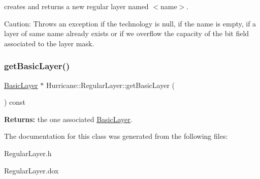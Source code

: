 creates and returns a new regular layer named {\ttfamily $<$name$>$}.

\begin{DoxyParagraph}{Caution\+:}
Throws an exception if the technology is null, if the name is empty, if a layer of same name already exists or if we overflow the capacity of the bit field associated to the layer mask. 
\end{DoxyParagraph}
\mbox{\label{classHurricane_1_1RegularLayer_a148c5839b544c2a0aa5d25be5958dfaf}} 
\subsubsection{\texorpdfstring{get\+Basic\+Layer()}{getBasicLayer()}}
{\footnotesize\ttfamily \hyperlink{classHurricane_1_1BasicLayer}{Basic\+Layer} $\ast$ Hurricane\+::\+Regular\+Layer\+::get\+Basic\+Layer (\begin{DoxyParamCaption}{ }\end{DoxyParamCaption}) const\hspace{0.3cm}{\ttfamily [inline]}}

{\bfseries Returns\+:} the one associated \hyperlink{classHurricane_1_1BasicLayer}{Basic\+Layer}. 

The documentation for this class was generated from the following files\+:\begin{DoxyCompactItemize}
\item 
Regular\+Layer.\+h\item 
Regular\+Layer.\+dox\end{DoxyCompactItemize}
